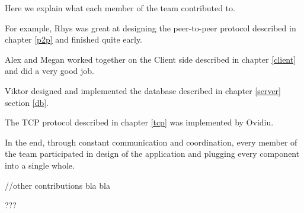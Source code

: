 \documentclass{l3proj}
\begin{document}
Here we explain what each member of the team contributed to.

For example, Rhys was great at designing the peer-to-peer protocol described in chapter \ref{p2p} and finished quite early.

Alex and Megan worked together on the Client side described in chapter \ref{client} and did a very good job.

Viktor designed and implemented the database described in chapter \ref{server} section \ref{db}.

The TCP protocol described in chapter \ref{tcp} was implemented by Ovidiu.

In the end, through constant communication and coordination, every member of the team participated in 
design of the application and plugging every component into a single whole.

//other contributions bla bla

???



\end{document}
